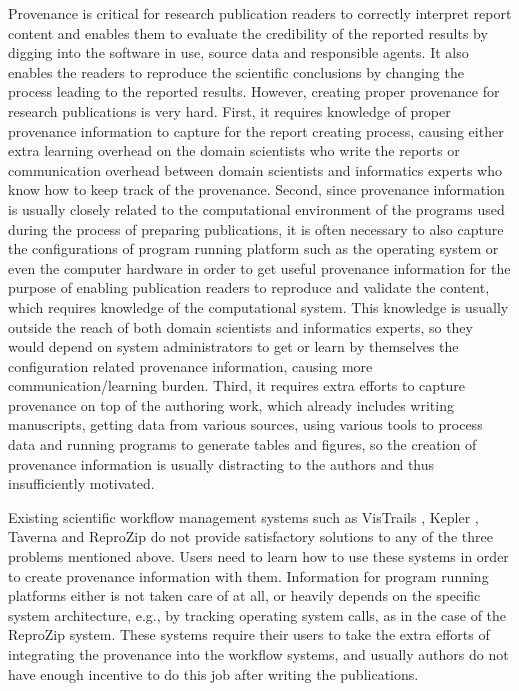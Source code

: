  
 
Provenance is critical for research publication readers to correctly interpret report content and enables them to evaluate the credibility of the reported results by digging into the software in use, source data and responsible agents. It also enables the readers to reproduce the scientific conclusions by changing the process leading to the reported results. However, creating proper provenance for research publications is very hard. First, it requires knowledge of proper provenance information to capture for the report creating process, causing either extra learning overhead on the domain scientists who write the reports or communication overhead between domain scientists and informatics experts who know how to keep track of the provenance. Second, since provenance information is usually closely related to the computational environment of the programs used during the process of preparing publications, it is often necessary to also capture the configurations of program running platform such as the operating system or even the computer hardware in order to get useful provenance information for the purpose of enabling publication readers to reproduce and validate the content, which requires knowledge of the computational system. This knowledge is usually outside the reach of both domain scientists and informatics experts, so they would depend on system administrators to get or learn by themselves the configuration related provenance information, causing more communication/learning burden. Third, it requires extra efforts to capture provenance on top of the authoring work, which already includes writing manuscripts, getting data from various sources, using various tools to process data and running programs to generate tables and figures, so the creation of provenance information is usually distracting to the authors and thus insufficiently motivated. 

Existing scientific workflow management systems such as VisTrails \cite{freire2014reproducibility}, Kepler \cite{ludascher2006scientific}, Taverna \cite{wolstencroft2013taverna} and ReproZip \cite{chirigati2013reprozip} do not provide satisfactory solutions to any of the three problems mentioned above. Users need to learn how to use these systems in order to create provenance information with them. Information for program running platforms either is not taken care of at all, or heavily depends on the specific system architecture, e.g., by tracking operating system calls, as in the case of the ReproZip system. These systems require their users to take the extra efforts of integrating the provenance into the workflow systems, and usually authors do not have enough incentive to do this job after writing the publications.

